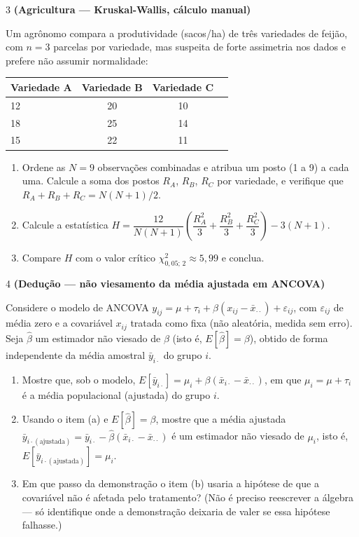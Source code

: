 \documentclass[11pt]{article}
\begin{document}
\begin{questao}{3} \textbf{(Agricultura --- Kruskal-Wallis, cálculo manual)}

Um agrônomo compara a produtividade (sacos/ha) de três variedades de feijão, com $n=3$ parcelas
por variedade, mas suspeita de forte assimetria nos dados e prefere não assumir normalidade:

\begin{center}
\begin{tabular}{lccc}
\toprule
Variedade A & Variedade B & Variedade C \\
\midrule
12 & 20 & 10 \\
18 & 25 & 14 \\
15 & 22 & 11 \\
\bottomrule
\end{tabular}
\end{center}

\begin{enumerate}[label=(\alph*)]
  \item Ordene as $N=9$ observações combinadas e atribua um posto (1 a 9) a cada uma. Calcule a
    soma dos postos $R_A$, $R_B$, $R_C$ por variedade, e verifique que $R_A+R_B+R_C = N(N+1)/2$.
  \item Calcule a estatística $H = \dfrac{12}{N(N+1)}\left(\dfrac{R_A^2}{3}+\dfrac{R_B^2}{3}+
    \dfrac{R_C^2}{3}\right) - 3(N+1)$.
  \item Compare $H$ com o valor crítico $\chi^2_{0{,}05;\,2} \approx 5{,}99$ e conclua.
\end{enumerate}
\end{questao}

\begin{questao}{4} \textbf{(Dedução --- não viesamento da média ajustada em ANCOVA)}

Considere o modelo de ANCOVA $y_{ij} = \mu + \tau_i + \beta(x_{ij}-\bar x_{\cdot\cdot}) +
\varepsilon_{ij}$, com $\varepsilon_{ij}$ de média zero e a covariável $x_{ij}$ tratada como
fixa (não aleatória, medida sem erro). Seja $\hat\beta$ um estimador não viesado de $\beta$
(isto é, $E[\hat\beta]=\beta$), obtido de forma independente da média amostral $\bar y_{i\cdot}$
do grupo $i$.

\begin{enumerate}[label=(\alph*)]
  \item Mostre que, sob o modelo, $E[\bar y_{i\cdot}] = \mu_i + \beta(\bar x_{i\cdot} - \bar
    x_{\cdot\cdot})$, em que $\mu_i = \mu+\tau_i$ é a média populacional (ajustada) do grupo $i$.
  \item Usando o item (a) e $E[\hat\beta]=\beta$, mostre que a média ajustada
    $\bar y_{i\cdot(\text{ajustada})} = \bar y_{i\cdot} - \hat\beta(\bar x_{i\cdot}-\bar
    x_{\cdot\cdot})$ é um estimador não viesado de $\mu_i$, isto é, $E[\bar
    y_{i\cdot(\text{ajustada})}] = \mu_i$.
  \item Em que passo da demonstração o item (b) usaria a hipótese de que a covariável não é
    afetada pelo tratamento? (Não é preciso reescrever a álgebra --- só identifique onde a
    demonstração deixaria de valer se essa hipótese falhasse.)
\end{enumerate}
\end{questao}
\end{document}
